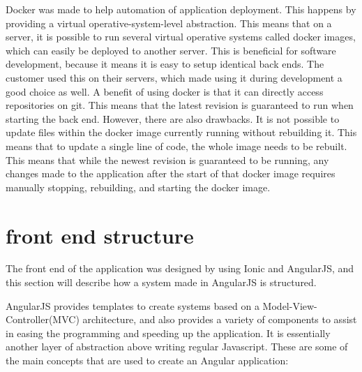 Docker \cite{EHW2} was made to help automation of application deployment. This happens by providing a virtual operative-system-level abstraction. This means that on a server, it is possible to run several virtual operative systems called docker images, which can easily be deployed to another server. This is beneficial for software development, because it means it is easy to setup identical back ends. The customer used this on their servers, which made using it during development a good choice as well. A benefit of using docker is that it can directly access repositories on git. This means that the latest revision is guaranteed to run when starting the back end. However, there are also drawbacks. It is not possible to update files within the docker image currently running without rebuilding it. This means that to update a single line of code, the whole image needs to be rebuilt. This means that while the newest revision is guaranteed to be running, any changes made to the application after the start of that docker image requires manually stopping, rebuilding, and starting the docker image.

\section{front end structure}
The front end of the application was designed by using Ionic and AngularJS, and this section will describe how a system made in AngularJS is structured.

AngularJS provides templates to create systems based on a Model-View-Controller(MVC) architecture, and also provides a variety of components to assist in easing the programming and speeding up the application. It is essentially another layer of abstraction above writing regular Javascript. These are some of the main concepts that are used to create an Angular application:

